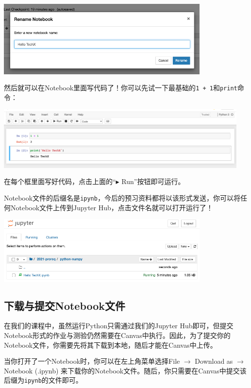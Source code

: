 \documentclass{article}
\begin{document}
\vspace*{0.3cm}\centerline{\noindent\includegraphics[width=0.8\textwidth]{ipynb-rename.png}}

然后就可以在Notebook里面写代码了！你可以先试一下最基础的\texttt{1 + 1}和\texttt{print}命令：

\vspace*{0.3cm}\centerline{\noindent\includegraphics[width=0.95\textwidth]{ipynb-code.png}}

在每个框里面写好代码，点击上面的“$\blacktriangleright$ Run”按钮即可运行。

Notebook文件的后缀名是\texttt{ipynb}，今后的预习资料都将以该形式发送，你可以将任何Notebook文件上传到Jupyter Hub，点击文件名就可以打开运行了！

\vspace*{0.3cm}\centerline{\noindent\includegraphics[width=0.8\textwidth]{ipynb-open.png}}

  \subsection{下载与提交Notebook文件}
  在我们的课程中，虽然运行Python只需通过我们的Jupyter Hub即可，但提交Notebook形式的作业与测验仍然需要在Canvas中执行。因此，为了提交你的Notebook文件，你需要先将其下载到本地，随后才能在Canvas中上传。
  
  当你打开了一个Notebook时，你可以在左上角菜单选择File $\rightarrow$ Download as $\rightarrow$ Notebook (.ipynb) 来下载你的Notebook文件。随后，你只需要在Canvas中提交该后缀为\texttt{ipynb}的文件即可。
  
\end{document}

